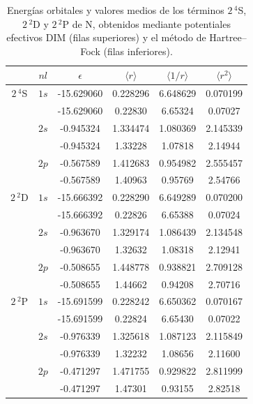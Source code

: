 \begin{table}
\centering
\begin{tabular}{cccccc}
\hline
   & $nl$ &  $\epsilon$  
   & $\langle r \rangle$
   & $\langle 1/r \rangle$ 
   & $\langle r^2 \rangle$ \\ 
\hline
$2\,^4$S & $1s$ & -15.629060 & 0.228296 & 6.648629 & 0.070199 \\
      &      & -15.629060 & 0.22830  & 6.65324  & 0.07027  \\
      & $2s$ & -0.945324  & 1.334474 & 1.080369 & 2.145339 \\
      &      & -0.945324  & 1.33228  & 1.07818  & 2.14944  \\
      & $2p$ & -0.567589  & 1.412683 & 0.954982 & 2.555457 \\
\vspace*{1ex}
      &      & -0.567589  & 1.40963  & 0.95769  & 2.54766  \\
$2\,^2$D & $1s$ & -15.666392 & 0.228290 & 6.649289 & 0.070200 \\
      &      & -15.666392 & 0.22826  & 6.65388  & 0.07024  \\
      & $2s$ & -0.963670  & 1.329174 & 1.086439 & 2.134548 \\
      &      & -0.963670  & 1.32632  & 1.08318  & 2.12941  \\
      & $2p$ & -0.508655  & 1.448778 & 0.938821 & 2.709128 \\
\vspace*{1ex}
      &      & -0.508655  & 1.44662  & 0.94208  & 2.70716  \\
$2\,^2$P & $1s$ & -15.691599 & 0.228242 & 6.650362 & 0.070167 \\
      &      & -15.691599 & 0.22824  & 6.65430  & 0.07022  \\
      & $2s$ & -0.976339  & 1.325618 & 1.087123 & 2.115849 \\
      &      & -0.976339  & 1.32232  & 1.08656  & 2.11600  \\
      & $2p$ & -0.471297  & 1.471755 & 0.929822 & 2.811999 \\
      &      & -0.471297  & 1.47301  & 0.93155  & 2.82518  \\
\hline
\end{tabular}
\caption[Energías y valores medios orbitales de nitrógeno.]
{Energías orbitales y valores medios de los términos 
$2\,^4$S, $2\,^2$D y $2\,^2$P de N, obtenidos mediante potentiales 
efectivos DIM (filas superiores) y el método de Hartree--Fock (filas 
inferiores).} 
\label{tab:resultsNitro}
\end{table}

